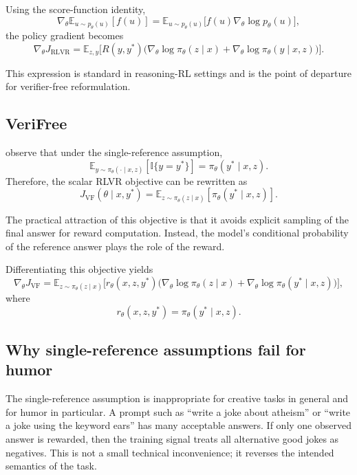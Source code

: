 \documentclass[14pt,a4paper]{extreport}
\begin{document}
Using the score-function identity,
\[
  \nabla_{\theta}\mathbb{E}_{u\sim p_{\theta}(u)}[f(u)]
  =
  \mathbb{E}_{u\sim p_{\theta}(u)}\big[f(u)\nabla_{\theta}\log p_{\theta}(u)\big],
\]
the policy gradient becomes
\[
  \nabla_{\theta}J_{\text{RLVR}}
  =
  \mathbb{E}_{z,y}
  \Big[
    R(y,y^{*})
    \big(
    \nabla_{\theta}\log\pi_{\theta}(z\mid x)
    +
    \nabla_{\theta}\log\pi_{\theta}(y\mid x,z)
    \big)
    \Big].
\]

This expression is standard in reasoning-RL settings and is the point of departure for verifier-free reformulation.

\subsection{VeriFree}

\citet{Zhou2025} observe that under the single-reference assumption,
\[
  \mathbb{E}_{y\sim\pi_{\theta}(\cdot\mid x,z)}[\mathbb{I}\{y=y^{*}\}]
  =
  \pi_{\theta}(y^{*}\mid x,z).
\]
Therefore, the scalar RLVR objective can be rewritten as
\[
  J_{\text{VF}}(\theta\mid x,y^{*})
  =
  \mathbb{E}_{z\sim\pi_{\theta}(z\mid x)}[\pi_{\theta}(y^{*}\mid x,z)].
\]

The practical attraction of this objective is that it avoids explicit sampling of the final answer for reward computation. Instead, the model's conditional probability of the reference answer plays the role of the reward.

Differentiating this objective yields
\[
  \nabla_{\theta}J_{\text{VF}}
  =
  \mathbb{E}_{z\sim\pi_{\theta}(z\mid x)}
  \Big[
    r_{\theta}(x,z,y^{*})
    \big(
    \nabla_{\theta}\log\pi_{\theta}(z\mid x)
    +
    \nabla_{\theta}\log\pi_{\theta}(y^{*}\mid x,z)
    \big)
    \Big],
\]
where
\[
  r_{\theta}(x,z,y^{*})=\pi_{\theta}(y^{*}\mid x,z).
\]

\subsection{Why single-reference assumptions fail for humor}

The single-reference assumption is inappropriate for creative tasks in general and for humor in particular. A prompt such as ``write a joke about atheism'' or ``write a joke using the keyword ears'' has many acceptable answers. If only one observed answer is rewarded, then the training signal treats all alternative good jokes as negatives. This is not a small technical inconvenience; it reverses the intended semantics of the task.
\end{document}

